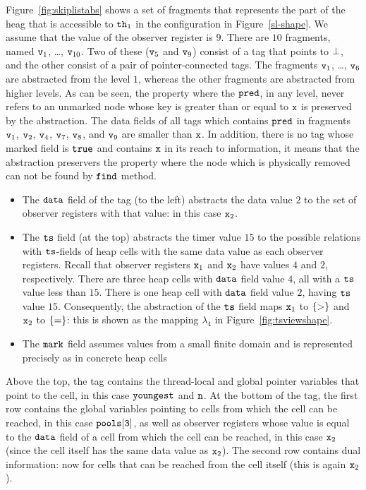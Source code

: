Figure~\ref{fig:skiplistabs} shows a set of fragments that represents the
part of the heag that is accessible to
${\tt th}_1$ in the configuration in Figure~\ref{sl-shape}. We assume that
the value of the observer register is $9$. 
There are $10$ fragments, named $\mathtt{v}_1$, \ldots , $\mathtt{v}_{10}$. Two of
these ($\mathtt{v}_5$ and $\mathtt{v}_9$) consist of a tag that points to $\bot$,
and the other consist of a pair of pointer-connected tags. The fragments $\mathtt{v}_1$, \ldots , $\mathtt{v}_{6}$ are abstracted from the level $1$, whereas the other fragments are abstracted from higher levels. As can be seen, the property where the $\tt pred$, in any level, never refers to an unmarked node whose key is greater than or equal to $\tt x$ is preserved by the abstraction. The data fields of all tags which contains $\tt pred$ in fragments $\mathtt{v}_1$, $\mathtt{v}_2$, $\mathtt{v}_4$, $\mathtt{v}_7$, $\mathtt{v}_8$, and $\mathtt{v}_9$ are smaller than $\tt x$.  In addition, there is no tag whose marked field is $\tt true$ and contains $\tt x$ in its reach to information, it means that the abstraction preservers the property where the node which is physically removed can not be found by $\tt find$ method.   
\begin{itemize}
\item The $\tt data$ field of the tag (to the left) abstracts the data value
  $2$ to the set of observer registers with that value: in this case
  $\mathtt{x}_2$.
\item The $\tt ts$ field (at the top) abstracts the timer value $15$ to
  the possible relations with $\tt ts$-fields of heap cells with the same
  data value as each observer registers. Recall that observer registers
  $\mathtt{x}_1$ and $\mathtt{x}_2$ have values $4$ and $2$, respectively. There are
  three heap cells with $\tt data$ field value $4$, all with a $\tt ts$
  value less than $15$. There is one heap cell with
  $\tt data$ field value $2$, having $\tt ts$ value $15$.
  Consequently, the abstraction of the $\tt ts$ field maps $\mathtt{x}_1$ to
  $\left\{>\right\}$ and $\mathtt{x}_2$ to $\left\{=\right\}$: this is shown as the mapping
  $\lambda_4$ in Figure~\ref{fig:tsviewshape}.
\item The $\tt mark$ field assumes values from a small finite domain and
  is represented precisely as in concrete heap cells
\end{itemize}
Above the top, the tag contains the thread-local and global pointer variables
that point to the cell, in this case $\tt youngest$ and $\tt n$.
At the bottom of the tag, the first row contains the global variables 
pointing to cells from which the cell can be reached, in this case
$\tt pools[3]$, as well as observer registers whose value is equal to the
${\tt data}$ field of a cell from which  the cell can be reached, in this
case $\mathtt{x}_2$ (since the cell itself has the same data value as $\mathtt{x}_2$).
The second row contains dual information: now for cells that can be reached
from the cell itself (this is again $\mathtt{x}_2$).

